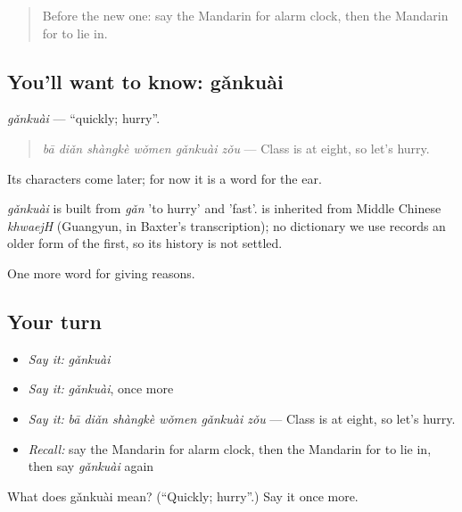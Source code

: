 \label{lesson:ZH-C145-gankuai}



\begin{quote}
Before the new one: say the Mandarin for alarm clock, then the Mandarin for to lie in.
\end{quote}

\subsection*{You'll want to know: gǎnkuài}
\emph{gǎnkuài} — \textquotedblleft{}quickly; hurry\textquotedblright{}.

\begin{quote}
\emph{bā diǎn shàngkè wǒmen gǎnkuài zǒu} — Class is at eight, so let's hurry.
\end{quote}

Its characters come later; for now it is a word for the ear.

\begin{cousinweb}
\emph{gǎnkuài} is built from \emph{gǎn} 'to hurry' and  'fast'.  is inherited from Middle Chinese \emph{khwaejH} (Guangyun, in Baxter's transcription); no dictionary we use records an older form of the first, so its history is not settled.
\end{cousinweb}

\begin{grammarlens}[title={What you've built}]
One more word for giving reasons.
\end{grammarlens}

\subsection*{Your turn}
\begin{itemize}
\raggedright
  \item \emph{Say it:} \emph{gǎnkuài}
  \item \emph{Say it:} \emph{gǎnkuài}, once more
  \item \emph{Say it:} \emph{bā diǎn shàngkè wǒmen gǎnkuài zǒu} — Class is at eight, so let's hurry.
  \item \emph{Recall:} say the Mandarin for alarm clock, then the Mandarin for to lie in, then say \emph{gǎnkuài} again
\end{itemize}

\begin{tcolorbox}[breakable,colback=teal!4,colframe=teal!35!black,title={Before you move on}]
What does gǎnkuài mean? (\textquotedblleft{}Quickly; hurry\textquotedblright{}.) Say it once more.
\end{tcolorbox}
